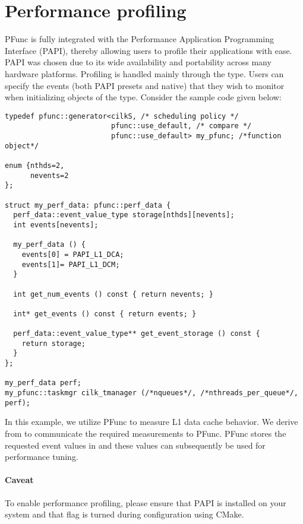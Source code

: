 \section{Performance profiling}
\label{sec:perf}

PFunc is fully integrated with the Performance Application Programming
Interface (PAPI), thereby allowing users to profile their
applications with ease. PAPI was chosen due to its wide availability and
portability across many hardware platforms. Profiling is handled mainly through
the  type. Users can specify the events (both PAPI presets and
native) that they wish to monitor when initializing objects of the
 type. Consider the sample code given below:

\begin{lstlisting}
typedef pfunc::generator<cilkS, /* scheduling policy */
                         pfunc::use_default, /* compare */
                         pfunc::use_default> my_pfunc; /*function object*/

enum {nthds=2,
      nevents=2
};

struct my_perf_data: pfunc::perf_data {
  perf_data::event_value_type storage[nthds][nevents];
  int events[nevents];

  my_perf_data () {
    events[0] = PAPI_L1_DCA; 
    events[1]= PAPI_L1_DCM;
  }

  int get_num_events () const { return nevents; }

  int* get_events () const { return events; }

  perf_data::event_value_type** get_event_storage () const {
    return storage; 
  }
};

my_perf_data perf;
my_pfunc::taskmgr cilk_tmanager (/*nqueues*/, /*nthreads_per_queue*/, perf);
\end{lstlisting}

In this example, we utilize PFunc to measure L1 data cache behavior. We
derive from  to communicate the required
measurements to PFunc. PFunc stores the requested event values in
 and these values can subsequently be used for performance
tuning.

\paragraph{Caveat} To enable performance profiling, please ensure that PAPI 
is installed on your system and that  flag is turned 
 during configuration using CMake.

